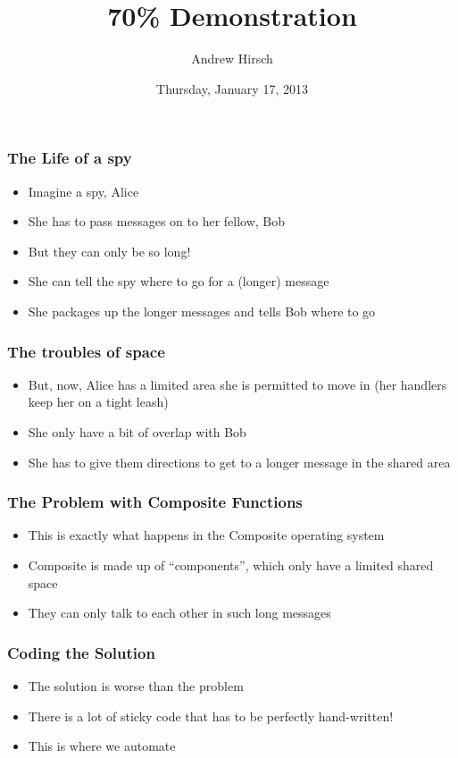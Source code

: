 \documentclass[bigger]{beamer}
\institute[GWU]{The George Washington University}
\title{70\% Demonstration}
\author{Andrew Hirsch}
\date{Thursday, January 17, 2013 }
\begin{document}
\maketitle



\begin{frame}
\frametitle{The Life of a spy}
\label{sec-1}

\begin{itemize}
\item Imagine a spy, Alice
\item She has to pass messages on to her fellow, Bob
\item But they can only be so long!
\item She can tell the spy where to go for a (longer) message
\item She packages up the longer messages and tells Bob where to go
\end{itemize}
\end{frame}
\begin{frame}
\frametitle{The troubles of space}
\label{sec-2}

\begin{itemize}
\item But, now, Alice has a limited area she is permitted to move in (her handlers keep her on a tight leash)
\item She only have a bit of overlap with Bob
\item She has to give them directions to get to a longer message in the shared area
\end{itemize}
\end{frame}
\begin{frame}
\frametitle{The Problem with Composite Functions}
\label{sec-3}

\begin{itemize}
\item This is exactly what happens in the Composite operating system
\item Composite is made up of ``components'', which only have a limited shared space
\item They can only talk to each other in such long messages
\end{itemize}
\end{frame}
\begin{frame}
\frametitle{Coding the Solution}
\label{sec-4}

\begin{itemize}
\item The solution is worse than the problem
\item There is a lot of sticky code that has to be perfectly hand-written!
\item This is where we automate
\end{itemize}
\end{frame}
\end{document}
